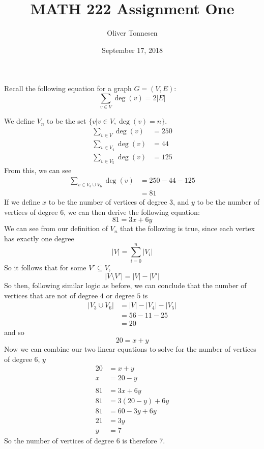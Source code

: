 \documentclass{article}
\title{MATH 222 Assignment One}
\author{Oliver Tonnesen}
\date{September 17, 2018}
\begin{document}
\maketitle
\renewcommand{\thesubsection}{\thesection.\alph{subsection}}
\section{} %
Recall the following equation for a graph $G=(V,E)$:
\[\sum_{v\in{V}} {\deg(v)}=2|E|\]

We define $V_n$ to be the set $\{v|v\in{V},\deg(v)=n\}$.
\begin{align*}
	\sum_{v\in{V}} {\deg(v)} &= 250\\
	\sum_{v\in{V_4}} {\deg(v)} &= 44\\
	\sum_{v\in{V_5}} {\deg(v)} &= 125
\end{align*}
From this, we can see
\begin{align*}
	\sum_{v\in{V_3\cup{V_6}}} {\deg(v)} &= 250 - 44 - 125\\
	&= 81
\end{align*}
If we define $x$ to be the number of vertices of degree $3$, and $y$ to be the number of vertices of degree $6$, we can then derive the following equation:
\[81 = 3x+6y\]
We can see from our definition of $V_n$ that the following is true, since each vertex has exactly one degree
\[|V|=\sum_{i=0}^{n} {|V_i|}\]
So it follows that for some $V'\subseteq{V}$,
\[|V\setminus{V'}| = |V| - |V'|\]
So then, following similar logic as before, we can conclude that the number of vertices that are not of degree $4$ or degree $5$ is
\begin{align*}
	|V_3\cup{V_6}| &= |V| - |V_4| - |V_5|\\
	&= 56-11-25\\
	&= 20
\end{align*}
and so
\[20 = x+y\]
Now we can combine our two linear equations to solve for the number of vertices of degree 6, $y$
\begin{align*}
	20&=x+y\\
	x&=20-y\\\\
	81&=3x+6y\\
	81&=3(20-y)+6y\\
	81&=60-3y+6y\\
	21&=3y\\
	y&=7
\end{align*}
So the number of vertices of degree 6 is therefore 7.

\section{} %
\end{document}
